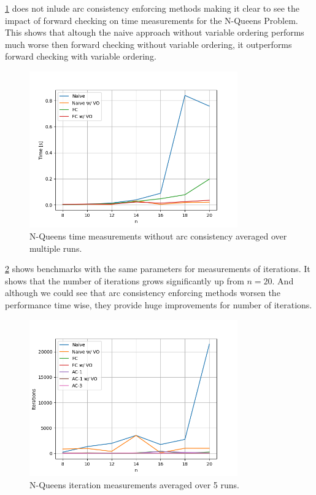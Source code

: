 \cref{fig:queens:time-no-arc} does not inlude arc consistency enforcing methods making it clear to see the impact of forward checking on time measurements for the N-Queens Problem. This shows that altough the naive approach without variable ordering performs much worse then forward checking without variable ordering, it outperforms forward checking with variable ordering.

\begin{figure}[ht]
	\centering
	\includegraphics[width=0.8\textwidth]{./Problems/queens/plots/time_no_arc.png}
	\caption{N-Queens time measurements without arc consistency averaged over multiple runs.}
	\label{fig:queens:time-no-arc}
\end{figure}

\cref{fig:queens:iterations} shows benchmarks with the same parameters for measurements of iterations. It shows that the number of iterations grows significantly up from $n = 20$. And although we could see that arc consistency enforcing methods worsen the performance time wise, they provide huge improvements for number of iterations.

\begin{figure}[ht]
	\centering
	\includegraphics[width=0.8\textwidth]{./Problems/queens/plots/iterations.png}
	\caption{N-Queens iteration measurements averaged over 5 runs.}
	\label{fig:queens:iterations}
\end{figure}


